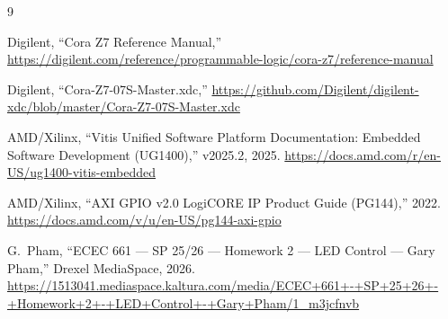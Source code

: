 \documentclass[12pt]{article}
\begin{document}
\begin{thebibliography}{9}

Digilent, ``Cora Z7 Reference Manual,''
\url{https://digilent.com/reference/programmable-logic/cora-z7/reference-manual}

Digilent, ``Cora-Z7-07S-Master.xdc,''
\url{https://github.com/Digilent/digilent-xdc/blob/master/Cora-Z7-07S-Master.xdc}

AMD/Xilinx, ``Vitis Unified Software Platform Documentation: Embedded
Software Development (UG1400),'' v2025.2, 2025.
\url{https://docs.amd.com/r/en-US/ug1400-vitis-embedded}

AMD/Xilinx, ``AXI GPIO v2.0 LogiCORE IP Product Guide (PG144),''
2022.
\url{https://docs.amd.com/v/u/en-US/pg144-axi-gpio}

G.~Pham, ``ECEC 661 --- SP 25/26 --- Homework 2 --- LED Control ---
Gary Pham,'' Drexel MediaSpace, 2026.
\url{https://1513041.mediaspace.kaltura.com/media/ECEC+661+-+SP+25+26+-+Homework+2+-+LED+Control+-+Gary+Pham/1_m3jcfnvb}

\end{thebibliography}
\end{document}
